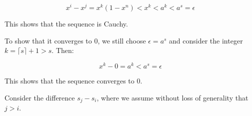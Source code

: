 \documentclass[12pt]{article}
\begin{document}
\begin{equation}
    x^{i} - x^{j} = x^{k} (1 - x^{n}) < x^{k} < a^{k} < a^{s} = \epsilon
\end{equation}

This shows that the sequence is Cauchy.

To show that it converges to $0$, we still choose $\epsilon = a^{s}$ and consider the integer $k = \lceil s \rceil + 1 > s$. Then:

\begin{equation}
    x^{k} - 0 = a^{k} < a^{s} = \epsilon
\end{equation}

This shows that the sequence converges to $0$.

Consider the difference $s_{j} - s_{i}$, where we assume without loss of generality that $j > i$. 
\end{document}
